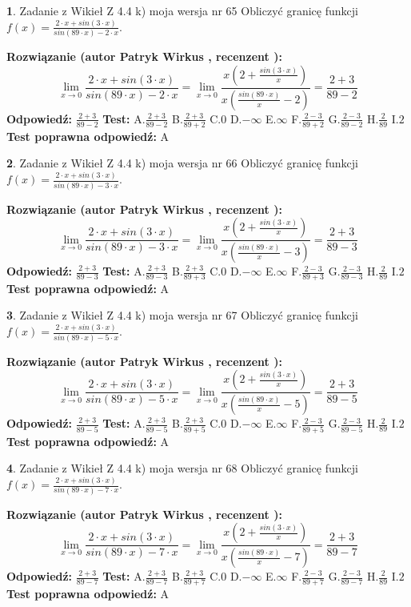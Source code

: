 \documentclass[12pt, a4paper]{article}
\theoremstyle{definition} %
\newtheorem{zad}{}
\newcommand{\zadStart}[1]{\begin{zad}#1\newline}
\newcommand{\zadStop}{\end{zad}}
\newcommand{\rozwStart}[2]{\noindent \textbf{Rozwiązanie (autor #1 , recenzent #2): }\newline}
\newcommand{\rozwStop}{\newline}
\newcommand{\odpStart}{\noindent \textbf{Odpowiedź:}\newline}
\newcommand{\odpStop}{\newline}
\newcommand{\testStart}{\noindent \textbf{Test:}\newline}
\newcommand{\testStop}{\newline}
\newcommand{\kluczStart}{\noindent \textbf{Test poprawna odpowiedź:}\newline}
\newcommand{\kluczStop}{\newline}
\begin{document}
\zadStart{Zadanie z Wikieł Z 4.4 k) moja wersja nr 65}
Obliczyć granicę funkcji $f(x)=\frac{2\cdot x +sin(3\cdot x)}{sin(89\cdot x) -2\cdot x}$.
\zadStop
\rozwStart{Patryk Wirkus}{}
$$\lim\limits_{x\to 0}\frac{2\cdot x +sin(3\cdot x)}{sin(89\cdot x) -2\cdot x}
=\lim\limits_{x\to 0}\frac{x(2+\frac{sin(3\cdot x)}{x})}{x(\frac{sin(89\cdot x)}{x}-2)}
=\frac{2+3}{89-2}$$
\rozwStop
\odpStart
$\frac{2+3}{89-2}$
\odpStop
\testStart
A.$\frac{2+3}{89-2}$
B.$\frac{2+3}{89+2}$
C.$0$
D.$-\infty$
E.$\infty$
F.$\frac{2-3}{89+2}$
G.$\frac{2-3}{89-2}$
H.$\frac{2}{89}$
I.$2$
\testStop
\kluczStart
A
\kluczStop



\zadStart{Zadanie z Wikieł Z 4.4 k) moja wersja nr 66}
Obliczyć granicę funkcji $f(x)=\frac{2\cdot x +sin(3\cdot x)}{sin(89\cdot x) -3\cdot x}$.
\zadStop
\rozwStart{Patryk Wirkus}{}
$$\lim\limits_{x\to 0}\frac{2\cdot x +sin(3\cdot x)}{sin(89\cdot x) -3\cdot x}
=\lim\limits_{x\to 0}\frac{x(2+\frac{sin(3\cdot x)}{x})}{x(\frac{sin(89\cdot x)}{x}-3)}
=\frac{2+3}{89-3}$$
\rozwStop
\odpStart
$\frac{2+3}{89-3}$
\odpStop
\testStart
A.$\frac{2+3}{89-3}$
B.$\frac{2+3}{89+3}$
C.$0$
D.$-\infty$
E.$\infty$
F.$\frac{2-3}{89+3}$
G.$\frac{2-3}{89-3}$
H.$\frac{2}{89}$
I.$2$
\testStop
\kluczStart
A
\kluczStop



\zadStart{Zadanie z Wikieł Z 4.4 k) moja wersja nr 67}
Obliczyć granicę funkcji $f(x)=\frac{2\cdot x +sin(3\cdot x)}{sin(89\cdot x) -5\cdot x}$.
\zadStop
\rozwStart{Patryk Wirkus}{}
$$\lim\limits_{x\to 0}\frac{2\cdot x +sin(3\cdot x)}{sin(89\cdot x) -5\cdot x}
=\lim\limits_{x\to 0}\frac{x(2+\frac{sin(3\cdot x)}{x})}{x(\frac{sin(89\cdot x)}{x}-5)}
=\frac{2+3}{89-5}$$
\rozwStop
\odpStart
$\frac{2+3}{89-5}$
\odpStop
\testStart
A.$\frac{2+3}{89-5}$
B.$\frac{2+3}{89+5}$
C.$0$
D.$-\infty$
E.$\infty$
F.$\frac{2-3}{89+5}$
G.$\frac{2-3}{89-5}$
H.$\frac{2}{89}$
I.$2$
\testStop
\kluczStart
A
\kluczStop



\zadStart{Zadanie z Wikieł Z 4.4 k) moja wersja nr 68}
Obliczyć granicę funkcji $f(x)=\frac{2\cdot x +sin(3\cdot x)}{sin(89\cdot x) -7\cdot x}$.
\zadStop
\rozwStart{Patryk Wirkus}{}
$$\lim\limits_{x\to 0}\frac{2\cdot x +sin(3\cdot x)}{sin(89\cdot x) -7\cdot x}
=\lim\limits_{x\to 0}\frac{x(2+\frac{sin(3\cdot x)}{x})}{x(\frac{sin(89\cdot x)}{x}-7)}
=\frac{2+3}{89-7}$$
\rozwStop
\odpStart
$\frac{2+3}{89-7}$
\odpStop
\testStart
A.$\frac{2+3}{89-7}$
B.$\frac{2+3}{89+7}$
C.$0$
D.$-\infty$
E.$\infty$
F.$\frac{2-3}{89+7}$
G.$\frac{2-3}{89-7}$
H.$\frac{2}{89}$
I.$2$
\testStop
\kluczStart
A
\kluczStop
\end{document}
